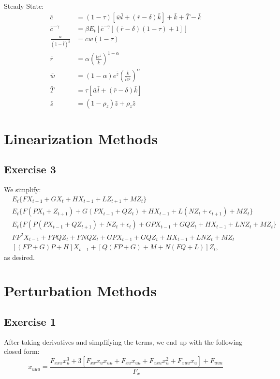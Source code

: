 \documentclass[UTF8]{article}
\begin{document}
Steady State:
\begin{align*}
	\bar{c} &= (1 - \tau)[\bar{w} \bar{l} + (\bar{r} -\delta)\bar{k}] + \bar{k} + \bar{T} - \bar{k} \\
	\bar{c} ^{-\gamma} &= \beta E_t\left[ \bar{c}^{-\gamma} [(\bar{r} - \delta)(1 - \tau) + 1]\right] \\
	\frac{a}{(1-\bar{l})^{\xi}} &= \bar{c} \bar{w} (1-\tau) \\
	\bar{r} &= \alpha \left( \frac{\bar{l} e^{\bar{z}}}{\bar{k}} \right)^{1 - \alpha} \\
	\bar{w} &= (1 - \alpha) e^{\bar{z}} \left( \frac{\bar{k}}{\bar{l} e^{\bar{z}}} \right)^{\alpha} \\
	 \bar{T} &= \tau[\bar{w} \bar{l} + (\bar{r} - \delta)\bar{k}] \\
	\bar{z} &= (1-\rho_z)\bar{z} + \rho_z \bar{z} 
\end{align*}


\section*{Linearization Methods}

\subsection*{Exercise 3}
We simplify:
\begin{align*}
&E_t\{FX_{t+1} + GX_t + HX_{t-1} + LZ_{t+1} + MZ_t\} \\
&E_t\{F(PX_t + Z_{t+1}) + G(PX_{t-1} + QZ_t) + HX_{t-1} + L(NZ_t + \epsilon_{t+1}) + MZ_t\} \\
&E_t\{F(P(PX_{t-1} + QZ_{t+1}) + NZ_t + \epsilon_t) + GPX_{t-1} + GQZ_t + HX_{t-1} + LNZ_t + MZ_t\} \\
&FP^2X_{t-1} + FPQZ_t + FNQZ_t +GPX_{t-1} + GQZ_t + HX_{t-1} + LNZ_t + MZ_t \\
&[(FP + G)P + H]X_{t-1} + [Q(FP + G)+ M + N(FQ + L)]Z_t,
\end{align*}
as desired.

\section*{Perturbation Methods}

\subsection*{Exercise 1}
After taking derivatives and simplifying the terms, we end up with the following closed form:
$$x_{uuu} =\frac{ F_{xxx}x_u^3 + 3[F_{xx}x_u x_{uu} + F_{xu}x_{uu} + F_{xxu}x_u^2 + F_{xuu}x_u] + F_{uuu}}{F_x}$$
\end{document}

